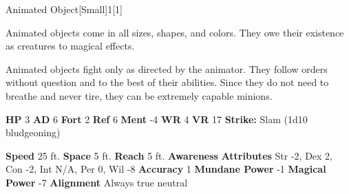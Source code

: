   
  \begin{monsection}{Animated Object}[Small]{1}[1]
    \vspace{-1em}\vspace{-1em}
    \vspace{0em}

    
    Animated objects come in all sizes, shapes, and colors. They owe their existence as creatures to magical effects.

    Animated objects fight only as directed by the animator. They follow orders without question and to the best of their abilities. Since they do not need to breathe and never tire, they can be extremely capable minions.
  
    

    \begin{spellcontent}
      \begin{spelltargetinginfo}
        \pari \textbf{HP} 3 \monsep
          \textbf{AD} 6 \monsep
          \textbf{Fort} 2 \monsep
          \textbf{Ref} 6 \monsep
          \textbf{Ment} -4
        \pari \textbf{WR} 4 \monsep
        \textbf{VR} 17
        \pari \textbf{Strike:}
            Slam  (1d10 bludgeoning)
      \end{spelltargetinginfo}
    \end{spellcontent}
    \begin{monsterfooter}
      \pari \textbf{Speed} 25 ft. \monsep
        \textbf{Space} 5 ft. \monsep
        \textbf{Reach} 5 ft.
      \pari \textbf{Awareness} 
      \pari \textbf{Attributes}
        Str -2, Dex 2,
        Con -2, Int N/A,
        Per 0, Wil -8
      \pari \textbf{Accuracy} 1 \monsep
        \textbf{Mundane Power} -1 \monsep
      \textbf{Magical Power} -7
      \pari \textbf{Alignment} Always true neutral
    \end{monsterfooter}
  \end{monsection}
  
